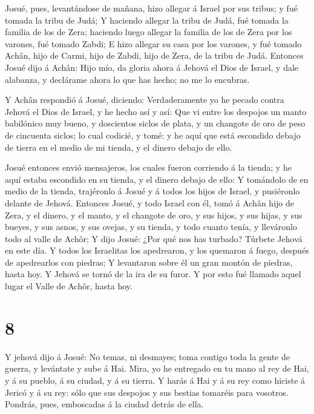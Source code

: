  Josué, pues, levantándose de mañana, hizo allegar á Israel
por sus tribus; y fué tomada la tribu de Judá;  Y haciendo
allegar la tribu de Judá, fué tomada la familia de los de Zera; haciendo
luego allegar la familia de los de Zera por los varones, fué tomado
Zabdi;  E hizo allegar su casa por los varones, y fué
tomado Achân, hijo de Carmi, hijo de Zabdi, hijo de Zera, de la tribu de
Judá.  Entonces Josué dijo á Achân: Hijo mío, da gloria
ahora á Jehová el Dios de Israel, y dale alabanza, y declárame ahora lo
que has hecho; no me lo encubras.

 Y Achân respondió á Josué, diciendo: Verdaderamente yo he
pecado contra Jehová el Dios de Israel, y he hecho así y así:
 Que vi entre los despojos un manto babilónico muy bueno, y
doscientos siclos de plata, y un changote de oro de peso de cincuenta
siclos; lo cual codicié, y tomé: y he aquí que está escondido debajo de
tierra en el medio de mi tienda, y el dinero debajo de ello.

 Josué entonces envió mensajeros, los cuales fueron
corriendo á la tienda; y he aquí estaba escondido en su tienda, y el
dinero debajo de ello:  Y tomándolo de en medio de la
tienda, trajéronlo á Josué y á todos los hijos de Israel, y pusiéronlo
delante de Jehová.  Entonces Josué, y todo Israel con él,
tomó á Achân hijo de Zera, y el dinero, y el manto, y el changote de
oro, y sus hijos, y sus hijas, y sus bueyes, y sus asnos, y sus ovejas,
y su tienda, y todo cuanto tenía, y lleváronlo todo al valle de Achôr;
 Y dijo Josué: ¿Por qué nos has turbado? Túrbete Jehová en
este día. Y todos los Israelitas los apedrearon, y los quemaron á fuego,
después de apedrearlos con piedras;  Y levantaron sobre él
un gran montón de piedras, hasta hoy. Y Jehová se tornó de la ira de su
furor. Y por esto fué llamado aquel lugar el Valle de Achôr, hasta hoy.

\hypertarget{section-7}{%
\section{8}\label{section-7}}

 Y jehová dijo á Josué: No temas, ni desmayes; toma contigo
toda la gente de guerra, y levántate y sube á Hai. Mira, yo he entregado
en tu mano al rey de Hai, y á su pueblo, á su ciudad, y á su tierra.
 Y harás á Hai y á su rey como hiciste á Jericó y á su rey:
sólo que sus despojos y sus bestias tomaréis para vosotros. Pondrás,
pues, emboscadas á la ciudad detrás de ella.

